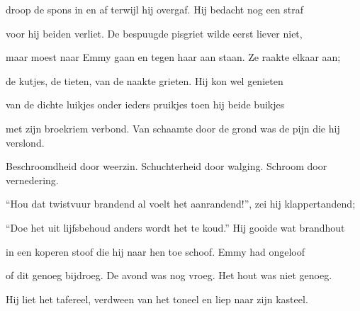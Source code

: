 droop de spons in en af
terwijl hij overgaf.
Hij bedacht nog een straf

voor hij beiden verliet.
De bespuugde pisgriet
wilde eerst liever niet,

maar moest naar Emmy gaan
en tegen haar aan staan.
Ze raakte elkaar aan;

de kutjes, de tieten,
van de naakte grieten.
Hij kon wel genieten

van de dichte luikjes
onder ieders pruikjes
toen hij beide buikjes

met zijn broekriem verbond.
Van schaamte door de grond
was de pijn die hij verslond.

Beschroomdheid door weerzin.
Schuchterheid door walging.
Schroom door vernedering.

“Hou dat twistvuur brandend
al voelt het aanrandend!”,
zei hij klappertandend;

“Doe het uit lijfsbehoud
anders wordt het te koud.”
Hij gooide wat brandhout

in een koperen stoof
die hij naar hen toe schoof.
Emmy had ongeloof

of dit genoeg bijdroeg.
De avond was nog vroeg.
Het hout was niet genoeg.

Hij liet het tafereel,
verdween van het toneel
en liep naar zijn kasteel.
